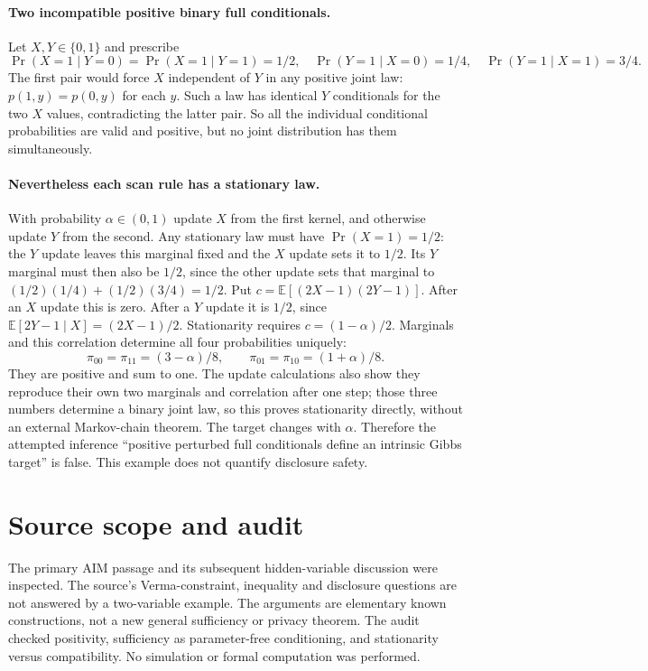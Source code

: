 \documentclass[11pt]{article}
\begin{document}
\paragraph{Two incompatible positive binary full conditionals.}
Let $X,Y\in\{0,1\}$ and prescribe
\[
\Pr(X=1\mid Y=0)=\Pr(X=1\mid Y=1)=1/2,
\quad\Pr(Y=1\mid X=0)=1/4,
\quad\Pr(Y=1\mid X=1)=3/4.
\]
The first pair would force $X$ independent of $Y$ in any positive joint
law: $p(1,y)=p(0,y)$ for each $y$. Such a law has identical $Y$ conditionals
for the two $X$ values, contradicting the latter pair. So all the
individual conditional probabilities are valid and positive, but no
joint distribution has them simultaneously.

\paragraph{Nevertheless each scan rule has a stationary law.}
With probability $\alpha\in(0,1)$ update $X$ from the first kernel,
and otherwise update $Y$ from the second. Any stationary law must have
$\Pr(X=1)=1/2$: the $Y$ update leaves this marginal fixed and the $X$
update sets it to $1/2$. Its $Y$ marginal must then also be $1/2$,
since the other update sets that marginal to
$(1/2)(1/4)+(1/2)(3/4)=1/2$.
Put $c=\mathbb E[(2X-1)(2Y-1)]$. After an $X$ update this is zero.
After a $Y$ update it is $1/2$, since
$\mathbb E[2Y-1\mid X]=(2X-1)/2$. Stationarity requires
$c=(1-\alpha)/2$. Marginals and this correlation determine all four
probabilities uniquely:
\[
\pi_{00}=\pi_{11}=(3-\alpha)/8,
\qquad\pi_{01}=\pi_{10}=(1+\alpha)/8.
\]
They are positive and sum to one. The update calculations also show
they reproduce their own two marginals and correlation after one step;
those three numbers determine a binary joint law, so this proves
stationarity directly, without an external Markov-chain theorem.
The target changes with $\alpha$. Therefore the attempted inference
``positive perturbed full conditionals define an intrinsic Gibbs target''
is false. This example does not quantify disclosure safety.

\section{Source scope and audit}
The primary AIM passage and its subsequent hidden-variable discussion
were inspected. The source's Verma-constraint, inequality and disclosure
questions are not answered by a two-variable example. The arguments are
elementary known constructions, not a new general sufficiency or privacy
theorem. The audit checked positivity, sufficiency as parameter-free
conditioning, and stationarity versus compatibility. No simulation or
formal computation was performed.
\end{document}

